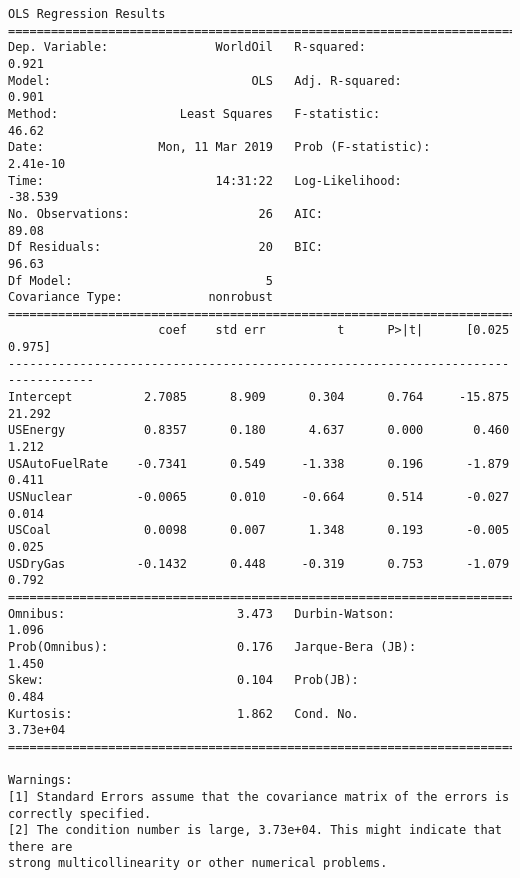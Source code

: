 \documentclass[11pt]{article}
\begin{document}
    \begin{Verbatim}[commandchars=\\\{\}]
                            OLS Regression Results                            
==============================================================================
Dep. Variable:               WorldOil   R-squared:                       0.921
Model:                            OLS   Adj. R-squared:                  0.901
Method:                 Least Squares   F-statistic:                     46.62
Date:                Mon, 11 Mar 2019   Prob (F-statistic):           2.41e-10
Time:                        14:31:22   Log-Likelihood:                -38.539
No. Observations:                  26   AIC:                             89.08
Df Residuals:                      20   BIC:                             96.63
Df Model:                           5                                         
Covariance Type:            nonrobust                                         
==================================================================================
                     coef    std err          t      P>|t|      [0.025      0.975]
----------------------------------------------------------------------------------
Intercept          2.7085      8.909      0.304      0.764     -15.875      21.292
USEnergy           0.8357      0.180      4.637      0.000       0.460       1.212
USAutoFuelRate    -0.7341      0.549     -1.338      0.196      -1.879       0.411
USNuclear         -0.0065      0.010     -0.664      0.514      -0.027       0.014
USCoal             0.0098      0.007      1.348      0.193      -0.005       0.025
USDryGas          -0.1432      0.448     -0.319      0.753      -1.079       0.792
==============================================================================
Omnibus:                        3.473   Durbin-Watson:                   1.096
Prob(Omnibus):                  0.176   Jarque-Bera (JB):                1.450
Skew:                           0.104   Prob(JB):                        0.484
Kurtosis:                       1.862   Cond. No.                     3.73e+04
==============================================================================

Warnings:
[1] Standard Errors assume that the covariance matrix of the errors is correctly specified.
[2] The condition number is large, 3.73e+04. This might indicate that there are
strong multicollinearity or other numerical problems.

    \end{Verbatim}
\end{document}
